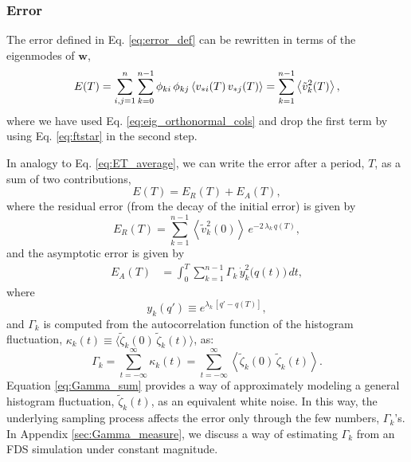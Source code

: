 \documentclass[reprint, superscriptaddress, floatfix]{revtex4-1}
\newcommand{\Err}{E}
\begin{document}
\subsubsection{Error}



The error defined in Eq. \eqref{eq:error_def}
can be rewritten in terms of the eigenmodes of $\mathbf w$,
%
\begin{align}
  \Err(T)
  =
  \sum_{i, j = 1}^n \sum_{k=0}^{n-1}
   \phi_{ki} \, \phi_{kj}
    \left\langle v_{*i}(T) \, v_{*j}(T) \right\rangle
  =
  \sum_{k = 1}^{n - 1}
    \left\langle
      {\tilde v}_k^2(T)
    \right\rangle
  ,
\notag
\end{align}
%
where we have used
Eq. \eqref{eq:eig_orthonormal_cols}
and drop the first term
by using Eq. \eqref{eq:ftstar}
in the second step.

In analogy to Eq. \eqref{eq:ET_average},
we can write the error after a period, $T$,
as a sum of two contributions,
%
\begin{equation}
  \Err(T)
  =
  \Err_R(T) + \Err_A(T),
  \label{eq:error_tot}
\end{equation}
%
where the residual error
(from the decay of the initial error)
is given by
%
\begin{equation}
  \Err_R(T)
  =
  \sum_{k = 1}^{n-1}
    \left\langle
      {\tilde v}_k^2(0)
    \right\rangle \,
    e^{ - 2 \, \lambda_k  \, q(T) },
  \label{eq:error_res}
\end{equation}
%
and the asymptotic error
is given by
%
\begin{align}
  \Err_A(T)
  &=
  \int_0^T
  \sum_{k = 1}^{n-1}
  \Gamma_k \, \dot y_k^2\bigl( q(t) \bigr) \, dt
  ,
\label{eq:error_asym}
\end{align}
%
where
%
\begin{equation}
  y_k(q') \equiv e^{\lambda_k \, [q' - q(T)]}
  ,
  \label{eq:uk_def}
\end{equation}
%
and $\Gamma_k$ is computed from
the autocorrelation function
of the histogram fluctuation,
$\kappa_k(t) \equiv \bigl\langle {\tilde \zeta}_k(0)
\, {\tilde \zeta}_k(t) \bigr\rangle$,
as:
%
\begin{equation}
  \Gamma_k
  = \sum_{t = -\infty}^\infty \kappa_k(t)
  = \sum_{t = -\infty}^\infty
  \left\langle {\tilde \zeta}_k(0)
            \, {\tilde \zeta}_k(t) \right\rangle
  .
  \label{eq:Gamma_sum}
\end{equation}
%
%
Equation \eqref{eq:Gamma_sum} provides a way
of approximately modeling
a general histogram fluctuation, ${\tilde \zeta}_k(t)$,
as an equivalent white noise.
In this way,
the underlying sampling process
affects the error only through the
few numbers, $\Gamma_k$'s.
%
In Appendix \ref{sec:Gamma_measure},
we discuss a way of estimating $\Gamma_k$
from an FDS simulation under constant magnitude.
%
\end{document}
